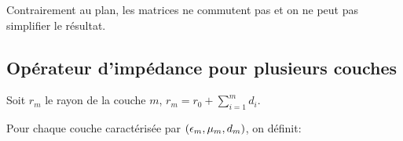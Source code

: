         Contrairement au plan, les matrices ne commutent pas et on ne peut pas simplifier le résultat.




    \subsection{Opérateur d'impédance pour plusieurs couches}

        \begin{figure}[!hbt]
            \centering
            \begin{tikzpicture}
                
            \end{tikzpicture}
        \end{figure}

        Soit $r_m$ le rayon de la couche $m$, $r_m = r_0 +\sum_{i=1}^{m} d_{i}$. 

        Pour chaque couche caractérisée par $(\eps_m,\mu_m,d_m)$, on définit:


